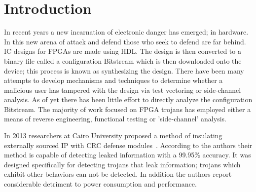 \documentclass[conference]{IEEEtran}
\begin{document}




%
\IEEEpeerreviewmaketitle



\section{Introduction}
In recent years a new incarnation of electronic danger has emerged; in hardware.
In this new arena of attack and defend those who seek to defend are far behind.
\acrfull{IC} designs for \acrfull{FPGAs} are made using \acrfull{HDL}.
The design is then converted to a binary file called a configuration \gls{Bitstream} which is then downloaded onto the device; this process is known as synthesizing the design.
There have been many attempts to develop mechanisms and techniques to determine whether a malicious user has tampered with the design via test vectoring or side-channel analysis.
As of yet there has been little effort to directly analyze the configuration \gls{Bitstream}.
The majority of work focused on \acrshort{FPGA} trojans has employed either a means of reverse engineering, functional testing or 'side-channel' analysis.

In 2013 researchers at Cairo University proposed a method of insulating externally sourced \acrshort{IP} with \acrfull{CRC} defense modules~\cite{crcDetection}.
According to the authors their method is capable of detecting leaked information with a 99.95\% accuracy.
It was designed specifically for detecting trojans that leak information; trojans which exhibit other behaviors can not be detected.
In addition the authors report considerable detriment to power consumption and performance.
\end{document}

